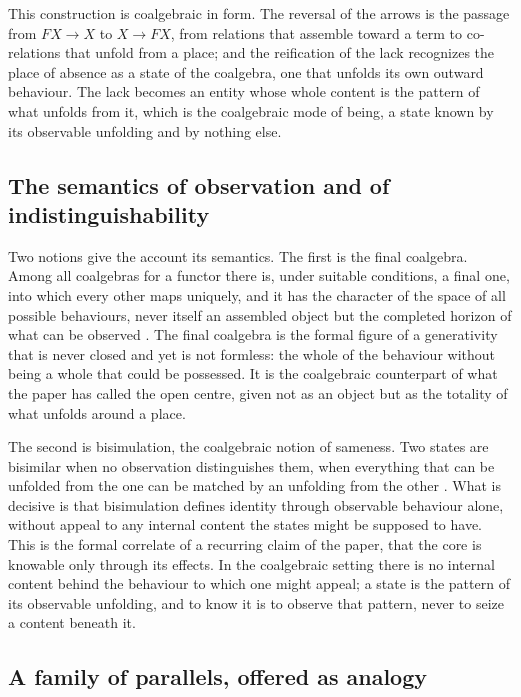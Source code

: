 This construction is coalgebraic in form. The reversal of the arrows is the passage from $F X \to X$ to $X \to F X$, from relations that assemble toward a term to co-relations that unfold from a place; and the reification of the lack recognizes the place of absence as a state of the coalgebra, one that unfolds its own outward behaviour. The lack becomes an entity whose whole content is the pattern of what unfolds from it, which is the coalgebraic mode of being, a state known by its observable unfolding and by nothing else.

\subsection*{The semantics of observation and of indistinguishability}

Two notions give the account its semantics. The first is the final coalgebra. Among all coalgebras for a functor there is, under suitable conditions, a final one, into which every other maps uniquely, and it has the character of the space of all possible behaviours, never itself an assembled object but the completed horizon of what can be observed \parencite{rutten2000universal}. The final coalgebra is the formal figure of a generativity that is never closed and yet is not formless: the whole of the behaviour without being a whole that could be possessed. It is the coalgebraic counterpart of what the paper has called the open centre, given not as an object but as the totality of what unfolds around a place.

The second is bisimulation, the coalgebraic notion of sameness. Two states are bisimilar when no observation distinguishes them, when everything that can be unfolded from the one can be matched by an unfolding from the other \parencite{jacobs2016introduction}. What is decisive is that bisimulation defines identity through observable behaviour alone, without appeal to any internal content the states might be supposed to have. This is the formal correlate of a recurring claim of the paper, that the core is knowable only through its effects. In the coalgebraic setting there is no internal content behind the behaviour to which one might appeal; a state is the pattern of its observable unfolding, and to know it is to observe that pattern, never to seize a content beneath it.

\subsection*{A family of parallels, offered as analogy}

